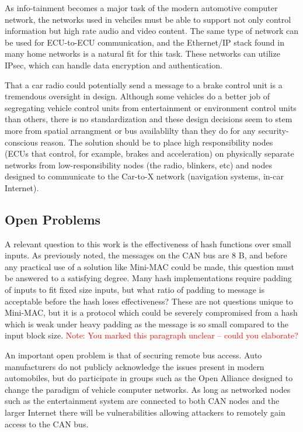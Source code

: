 {As info-tainment becomes a major task of the modern automotive computer network, the networks used in vehciles must be able to support not only control information but high rate audio and video content. The same type of network can be used for ECU-to-ECU communication, and the Ethernet/IP stack found in many home networks is a natural fit for this task. These networks can utilize IPsec, which can handle data encryption and authentication.

That a car radio could potentially send a message to a brake control unit is a tremendous oversight in design. Although some vehicles do a better job of segregating vehicle control units from entertainment or environment control units than others, there is no standardization and these design decisions seem to stem more from spatial arrangment or bus availablilty than they do for any security-conscious reason. The solution should be to place high responsibility nodes (ECUs that control, for example, brakes and acceleration) on physically separate networks from low-responsibility nodes (the radio, blinkers, etc) and nodes designed to communicate to the Car-to-X network (navigation systems, in-car Internet).


\subsection{Open Problems}
A relevant question to this work is the effectiveness of hash functions over small inputs. As previously noted, the messages on the CAN bus are 8 B, and before any practical use of a solution like Mini-MAC could be made, this question must be answered to a satisfying degree. Many hash implementations require padding of inputs to fit fixed size inputs, but what ratio of padding to message is acceptable before the hash loses effectiveness? These are not questions unique to Mini-MAC, but it is a protocol which could be severely compromised from a hash which is weak under heavy padding as the message is so small compared to the input block size. \textcolor{red}{Note: You marked this paragraph unclear -- could you elaborate?}

An important open problem is that of securing remote bus access. Auto manufacturers do not publicly acknowledge the issues present in modern automobiles, but do participate in groups such as the Open Alliance designed to change the paradigm of vehicle computer networks. As long as networked nodes such as the entertainment system are connected to both CAN nodes and the larger Internet there will be vulnerabilities allowing attackers to remotely gain access to the CAN bus.

}
